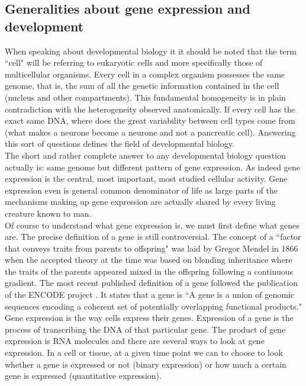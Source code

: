      \subsection{Generalities about gene expression and development}  
     When speaking about developmental biology it it should be noted that the term ``cell" will be referring to eukaryotic cells and more specifically those of multicellular organisms. Every cell in a complex organism possesses the same genome, that is, the sum of all the genetic information contained in the cell (nucleus and other compartments). This fundamental homogeneity is in plain contradiction with the heterogeneity observed anatomically. If every cell has the exact same DNA, where does the great variability between cell types come from (what makes a neurone become a neurone and not a pancreatic cell). Answering this sort of questions defines the field of developmental biology.\\
     
     The short and rather complete answer to any developmental biology question actually is: same genome but different pattern of gene expression. As indeed gene expression is the central, most important, most studied cellular activity. Gene expression even is general common denominator of life as large parts of the mechanisms making up gene expression are actually shared by every living creature known to man.\\

     Of course to understand what gene expression is, we must first define what genes are. The precise definition of a gene is still controversial. The concept of a ``factor that conveys traits from parents to offspring" was laid by Gregor Mendel in 1866 \cite{mendel66} when the accepted theory at the time was based on blending inheritance where the traits of the parents appeared mixed in the offspring following a continuous gradient. The most recent published definition of a gene followed the publication of the ENCODE project \cite{feingold04}. It states that a gene is ``A gene is a union of genomic sequences encoding a coherent set of potentially overlapping functional products."\\

	Gene expression is the way cells express their genes. Expression of a gene is the process of transcribing the DNA of that particular gene. The product of gene expression is RNA molecules and there are several ways to look at gene expression. In a cell or tissue, at a given time point we can to choose to look whether a gene is expressed or not (binary expression) or how much a certain gene is expressed (quantitative expression).\\
	
